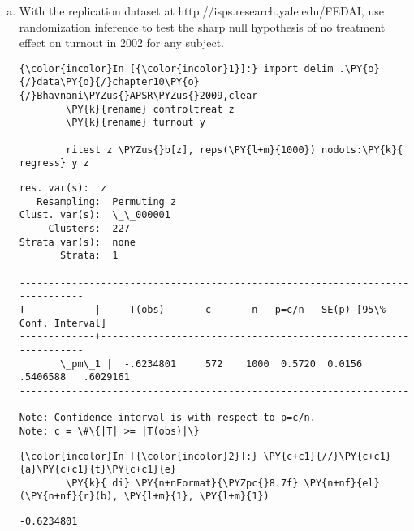 \documentclass[11pt,notitlepage]{article}\usepackage[]{graphicx}\usepackage[]{color}
\makeatletter
\newenvironment{kframe}{%
 \def\at@end@of@kframe{}%
 \ifinner\ifhmode%
  \def\at@end@of@kframe{\end{minipage}}%
  \begin{minipage}{\columnwidth}%
 \fi\fi%
 \def\FrameCommand##1{\hskip\@totalleftmargin \hskip-\fboxsep
 \colorbox{shadecolor}{##1}\hskip-\fboxsep
     \hskip-\linewidth \hskip-\@totalleftmargin \hskip\columnwidth}%
 \MakeFramed {\advance\hsize-\width
   \@totalleftmargin\z@ \linewidth\hsize
   \@setminipage}}%
 {\par\unskip\endMakeFramed%
 \at@end@of@kframe}
\newenvironment{knitrout}{}{} %
\makeatother
\begin{document}
\begin{enumerate}[a)]
\item With the replication dataset at http://isps.research.yale.edu/FEDAI, use randomization inference to test the sharp null hypothesis of no treatment effect on turnout in 2002 for any subject.

\begin{knitrout}
\color{fgcolor}\begin{kframe}
   \begin{Verbatim}[commandchars=\\\{\}]
{\color{incolor}In [{\color{incolor}1}]:} import delim .\PY{o}{/}data\PY{o}{/}chapter10\PY{o}{/}Bhavnani\PYZus{}APSR\PYZus{}2009,clear
        \PY{k}{rename} controltreat z
        \PY{k}{rename} turnout y
        
        ritest z \PYZus{}b[z], reps(\PY{l+m}{1000}) nodots:\PY{k}{ regress} y z
\end{Verbatim}

    \begin{Verbatim}[commandchars=\\\{\}]
  res. var(s):  z
   Resampling:  Permuting z
Clust. var(s):  \_\_000001
     Clusters:  227
Strata var(s):  none
       Strata:  1

------------------------------------------------------------------------------
T            |     T(obs)       c       n   p=c/n   SE(p) [95\% Conf. Interval]
-------------+----------------------------------------------------------------
       \_pm\_1 |  -.6234801     572    1000  0.5720  0.0156  .5406588   .6029161
------------------------------------------------------------------------------
Note: Confidence interval is with respect to p=c/n.
Note: c = \#\{|T| >= |T(obs)|\}

    \end{Verbatim}

    \begin{Verbatim}[commandchars=\\\{\}]
{\color{incolor}In [{\color{incolor}2}]:} \PY{c+c1}{//}\PY{c+c1}{a}\PY{c+c1}{t}\PY{c+c1}{e}
        \PY{k}{ di} \PY{n+nFormat}{\PYZpc{}8.7f} \PY{n+nf}{el}(\PY{n+nf}{r}(b), \PY{l+m}{1}, \PY{l+m}{1})
\end{Verbatim}

    \begin{Verbatim}[commandchars=\\\{\}]
-0.6234801

    \end{Verbatim}


\end{kframe}
\end{knitrout}
\end{enumerate}
\end{document}
